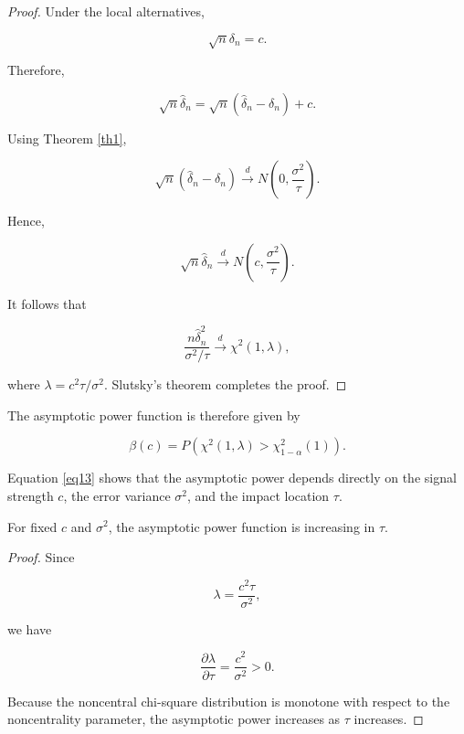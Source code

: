 \documentclass[twoside]{article}
\begin{document}
\begin{proof}
	Under the local alternatives,
	
	\[
	\sqrt n\delta_n=c.
	\]
	
	Therefore,
	
	\[
	\sqrt n\widehat{\delta}_n
	=
	\sqrt n(\widehat{\delta}_n-\delta_n)+c.
	\]
	
	Using Theorem \ref{th1},
	
	\[
	\sqrt n(\widehat{\delta}_n-\delta_n)
	\xrightarrow{d}
	N\left(
	0,
	\frac{\sigma^2}{\tau}
	\right).
	\]
	
	Hence,
	
	\[
	\sqrt n\widehat{\delta}_n
	\xrightarrow{d}
	N\left(
	c,
	\frac{\sigma^2}{\tau}
	\right).
	\]
	
	It follows that
	
	\[
	\frac{
		n\widehat{\delta}_n^2
	}{
		\sigma^2/\tau
	}
	\xrightarrow{d}
	\chi^2(1,\lambda),
	\]
	
	where $\lambda=c^2\tau/\sigma^2$. Slutsky's theorem completes the proof.
\end{proof}


The asymptotic power function is therefore given by

\begin{equation}\label{eq13}
	\beta(c)
	=
	P\left(
	\chi^2(1,\lambda)>
	\chi^2_{1-\alpha}(1)
	\right).
\end{equation}

Equation \eqref{eq13} shows that the asymptotic power depends directly on the signal strength $c$, the error variance $\sigma^2$, and the impact location $\tau$.


\begin{pro}\label{pr1}
	For fixed $c$ and $\sigma^2$, the asymptotic power function is increasing in $\tau$.
\end{pro}

\begin{proof}
	Since
	
	\[
	\lambda=\frac{c^2\tau}{\sigma^2},
	\]
	
	we have
	
	\[
	\frac{\partial\lambda}{\partial\tau}
	=
	\frac{c^2}{\sigma^2}>0.
	\]
	
	Because the noncentral chi-square distribution is monotone with respect to the noncentrality parameter, the asymptotic power increases as $\tau$ increases.
\end{proof}
\end{document}
